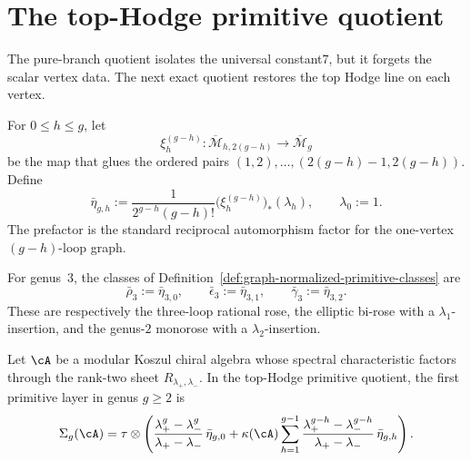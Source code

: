 \section{The top-Hodge primitive quotient}
\label{sec:blr-top-hodge-primitive}

The pure-branch quotient isolates the universal constant\;\(7\), but it
forgets the scalar vertex data. The next exact quotient restores the
top Hodge line on each vertex.

\begin{definition}
\label{def:graph-normalized-primitive-classes}
For \(0\leq h\leq g\), let
\[
\xi_h^{(g-h)}\colon
\overline{\mathcal M}_{h,2(g-h)}
\longrightarrow
\overline{\mathcal M}_g
\]
be the map that glues the ordered pairs
\((1,2),\dots,(2(g-h)-1,2(g-h))\). Define
\begin{equation}
\label{eq:eta-gh-definition}
\bar\eta_{g,h}
:=
\frac{1}{2^{g-h}(g-h)!}
\bigl(\xi_h^{(g-h)}\bigr)_*(\lambda_h),
\qquad
\lambda_0:=1.
\end{equation}
The prefactor is the standard reciprocal automorphism factor for the
one-vertex \((g-h)\)-loop graph.
\end{definition}

\begin{remark}
\label{rem:genus-three-basis-notation}
For genus~\(3\), the classes of
Definition~\ref{def:graph-normalized-primitive-classes} are
\[
\bar\rho_3:=\bar\eta_{3,0},
\qquad
\bar\epsilon_3:=\bar\eta_{3,1},
\qquad
\bar\gamma_3:=\bar\eta_{3,2}.
\]
These are respectively the three-loop rational rose, the elliptic
bi-rose with a \(\lambda_1\)-insertion, and the genus-\(2\) monorose
with a \(\lambda_2\)-insertion.
\end{remark}

\begin{theorem}
\label{thm:first-primitive-top-hodge-layer}
Let \(\cA\) be a modular Koszul chiral algebra whose spectral
characteristic factors through the rank-two sheet
\(R_{\lambda_+,\lambda_-}\). In the top-Hodge primitive quotient, the
first primitive layer in genus \(g\geq 2\) is
\begin{equation}
\label{eq:primitive-top-hodge-general}
\Sigma_g(\cA)
=
\tau\otimes
\left(
\frac{\lambda_+^g-\lambda_-^g}{\lambda_+-\lambda_-}
\,\bar\eta_{g,0}
+
\kappa(\cA)
\sum_{h=1}^{g-1}
\frac{\lambda_+^{g-h}-\lambda_-^{g-h}}{\lambda_+-\lambda_-}
\,\bar\eta_{g,h}
\right).
\end{equation}
\end{theorem}

